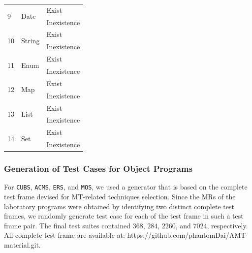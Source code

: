 \documentclass[10pt,journal,compsoc]{IEEEtran}
\begin{document}
\begin{table}[htb]
\begin{tabular}{lll}
  \multirow{2}{*}{9} &\multirow{2}{*}{Date}                                      &Exist\\
                     &                                                          &Inexistence\\ \midrule
  \multirow{2}{*}{10}&\multirow{2}{*}{String}                                    &Exist\\
                     &                                                          &Inexistence\\ \midrule
  \multirow{2}{*}{11}&\multirow{2}{*}{Enum}                                      &Exist\\
                     &                                                          &Inexistence\\ \midrule
  \multirow{2}{*}{12}&\multirow{2}{*}{Map}                                       &Exist\\
                     &                                                          &Inexistence\\ \midrule
  \multirow{2}{*}{13}&\multirow{2}{*}{List}                                      &Exist\\
                     &                                                          &Inexistence\\ \midrule
  \multirow{2}{*}{14}&\multirow{2}{*}{Set}                                       &Exist\\
                     &                                                          &Inexistence\\ \bottomrule
  \end{tabular}
\end{table}

\subsubsection{Generation of Test Cases for Object Programs}
\label{sec:testcases}

For \texttt{CUBS}, \texttt{ACMS}, \texttt{ERS}, and \texttt{MOS}, we used a generator that is based on the complete test frame devised for MT-related techniques selection. Since the MRs of the laboratory programs were obtained by identifying two distinct complete test frames, we randomly generate test case for each of the test frame in such a test frame pair. The final test suites contained $368$, $284$, $2260$, and $7024$, respectively. All complete test frame are available at: https://github.com/phantomDai/AMT-material.git.
\end{document}
